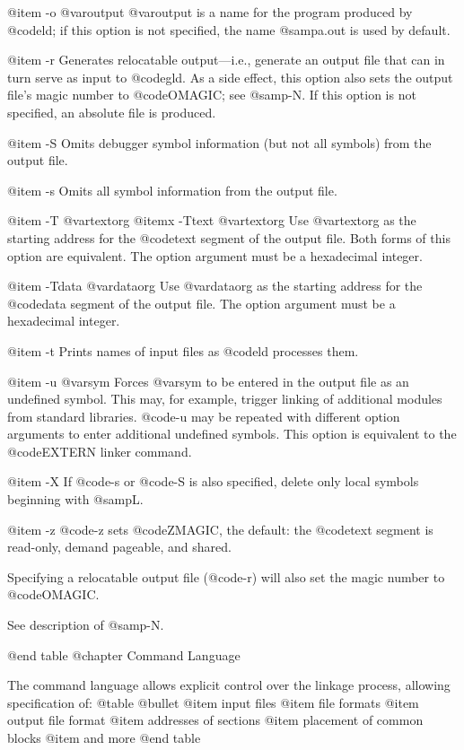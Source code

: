 @item -o @var{output}
@var{output} is a name for the program produced by @code{ld}; if this
option is not specified, the name @samp{a.out} is used by default.

@item -r 
Generates relocatable output---i.e., generate an output file that can in
turn serve as input to @code{gld}.  As a side effect, this option also
sets the output file's magic number to @code{OMAGIC}; see @samp{-N}. If this
option is not specified, an absolute file is produced.

@item -S 
Omits debugger symbol information (but not all symbols) from the output file.

@item -s 
Omits all symbol information from the output file.

@item -T @var{textorg} 
@itemx -Ttext @var{textorg}
Use @var{textorg} as the starting address for the @code{text} segment of the
output file.  Both forms of this option are equivalent.  The option
argument must be a hexadecimal integer.

@item -Tdata @var{dataorg} 
Use @var{dataorg} as the starting address for the @code{data} segment of
the output file.  The option argument must be a hexadecimal integer.

@item -t 
Prints names of input files as @code{ld} processes them.

@item -u @var{sym}
Forces @var{sym} to be entered in the output file as an undefined symbol.
This may, for example, trigger linking of additional modules from
standard libraries.  @code{-u} may be repeated with different option
arguments to enter additional undefined symbols. This option is equivalent
to the @code{EXTERN} linker command.

@item -X 
If @code{-s} or @code{-S} is also specified, delete only local symbols
beginning with @samp{L}.

@item -z
@code{-z} sets @code{ZMAGIC}, the default: the @code{text} segment is
read-only, demand pageable, and shared.  

Specifying a relocatable output file (@code{-r}) will also set the magic
number to @code{OMAGIC}.

See description of @samp{-N}.


@end table
@chapter Command Language


The command language allows explicit control over the linkage process, allowing
specification of:
@table @bullet
@item input files 
@item file formats
@item output file format
@item addresses of sections
@item placement of common blocks
@item and more
@end table

